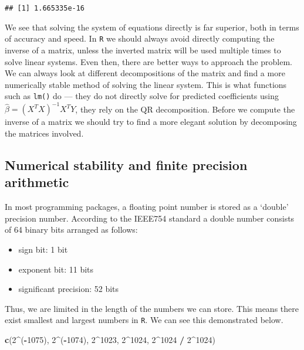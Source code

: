 \documentclass[]{article}
\newenvironment{Shaded}{\begin{snugshade}}{\end{snugshade}}
\newcommand{\DecValTok}[1]{\textcolor[rgb]{0.00,0.00,0.81}{#1}}
\newcommand{\KeywordTok}[1]{\textcolor[rgb]{0.13,0.29,0.53}{\textbf{#1}}}
\newcommand{\NormalTok}[1]{#1}
\newcommand{\OperatorTok}[1]{\textcolor[rgb]{0.81,0.36,0.00}{\textbf{#1}}}
\newcommand{\StringTok}[1]{\textcolor[rgb]{0.31,0.60,0.02}{#1}}
\providecommand{\tightlist}{%
  \setlength{\itemsep}{0pt}\setlength{\parskip}{0pt}}
\begin{document}
\begin{verbatim}
## [1] 1.665335e-16
\end{verbatim}

We see that solving the system of equations directly is far superior,
both in terms of accuracy and speed. In \texttt{R} we should always
avoid directly computing the inverse of a matrix, unless the inverted
matrix will be used multiple times to solve linear systems. Even then,
there are better ways to approach the problem. We can always look at
different decompositions of the matrix and find a more numerically
stable method of solving the linear system. This is what functions such
as \texttt{lm()} do --- they do not directly solve for predicted
coefficients using \(\hat{\beta} = (X^TX)^{-1}X^TY\), they rely on the
QR decomposition. Before we compute the inverse of a matrix we should
try to find a more elegant solution by decomposing the matrices
involved.

\hypertarget{numerical-stability-and-finite-precision-arithmetic}{%
\subsection{Numerical stability and finite precision
arithmetic}\label{numerical-stability-and-finite-precision-arithmetic}}

In most programming packages, a floating point number is stored as a
`double' precision number. According to the IEEE754 standard a double
number consists of 64 binary bits arranged as follows:

\begin{itemize}
\tightlist
\item
  sign bit: 1 bit
\item
  exponent bit: 11 bits
\item
  significant precision: 52 bits
\end{itemize}

Thus, we are limited in the length of the numbers we can store. This
means there exist smallest and largest numbers in \texttt{R}. We can see
this demonstrated below.

\begin{Shaded}
\begin{Highlighting}[]
\KeywordTok{c}\NormalTok{(}\DecValTok{2}\OperatorTok{^}\NormalTok{(}\OperatorTok{-}\DecValTok{1075}\NormalTok{), }\DecValTok{2}\OperatorTok{^}\NormalTok{(}\OperatorTok{-}\DecValTok{1074}\NormalTok{), }\DecValTok{2}\OperatorTok{^}\DecValTok{1023}\NormalTok{, }\DecValTok{2}\OperatorTok{^}\DecValTok{1024}\NormalTok{, }\DecValTok{2}\OperatorTok{^}\DecValTok{1024} \OperatorTok{/}\StringTok{ }\DecValTok{2}\OperatorTok{^}\DecValTok{1024}\NormalTok{)}
\end{Highlighting}
\end{Shaded}
\end{document}
